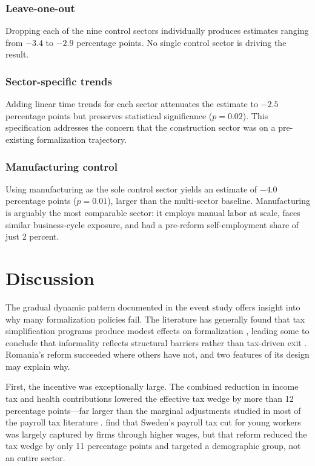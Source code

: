 \documentclass[12pt]{article}
\begin{document}
\subsubsection*{Leave-one-out} Dropping each of the nine control sectors individually produces estimates ranging from $-3.4$ to $-2.9$ percentage points. No single control sector is driving the result.

\subsubsection*{Sector-specific trends} Adding linear time trends for each sector attenuates the estimate to $-2.5$ percentage points but preserves statistical significance ($p = 0.02$). This specification addresses the concern that the construction sector was on a pre-existing formalization trajectory.

\subsubsection*{Manufacturing control} Using manufacturing as the sole control sector yields an estimate of $-4.0$ percentage points ($p = 0.01$), larger than the multi-sector baseline. Manufacturing is arguably the most comparable sector: it employs manual labor at scale, faces similar business-cycle exposure, and had a pre-reform self-employment share of just 2 percent.



\section{Discussion}
\label{sec:discussion}

The gradual dynamic pattern documented in the event study offers insight into why many formalization policies fail. The literature has generally found that tax simplification programs produce modest effects on formalization \citep{monteiro2012coming, bruhn2011reforming}, leading some to conclude that informality reflects structural barriers rather than tax-driven exit \citep{levy2008good}. Romania's reform succeeded where others have not, and two features of its design may explain why.

First, the incentive was exceptionally large. The combined reduction in income tax and health contributions lowered the effective tax wedge by more than 12 percentage points---far larger than the marginal adjustments studied in most of the payroll tax literature \citep{gruber1997incidence, kugler2009effects}. \citet{saez2019payroll} find that Sweden's payroll tax cut for young workers was largely captured by firms through higher wages, but that reform reduced the tax wedge by only 11 percentage points and targeted a demographic group, not an entire sector.
\end{document}
